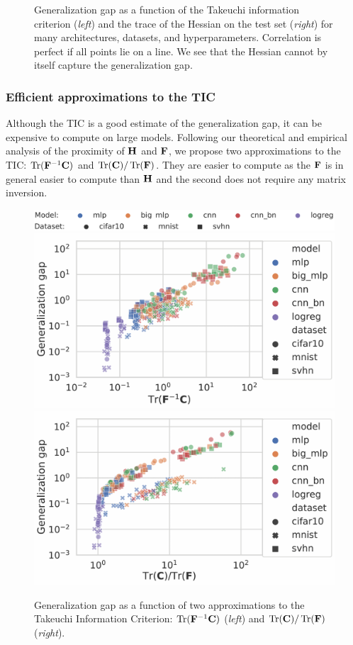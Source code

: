 \begin{figure}[ht]
      \caption{Generalization gap as a function of the Takeuchi information criterion (\emph{left}) and the trace of the Hessian on the test set (\emph{right}) for many architectures, datasets, and hyperparameters. Correlation is perfect if all points lie on a line. We see that the Hessian cannot by itself capture the generalization gap.}
      \label{fig:large_scale_tic}
\end{figure}




\subsubsection{Efficient approximations to the TIC}
\label{sec:tic_approx}
Although the TIC is a good estimate of the generalization gap, it can be expensive to compute on large models. Following our theoretical and empirical analysis of the proximity of ${\mathbf{H}}$ and ${\mathbf{F}}$, we propose two approximations to the TIC: $\operatorname{Tr}({\mathbf{F}}^{-1} {\mathbf{C}})$ and $\operatorname{Tr}({\mathbf{C}}) / \operatorname{Tr}({\mathbf{F}})$. They are easier to compute as the ${\mathbf{F}}$ is in general easier to compute than ${\mathbf{H}}$ and the second does not require any matrix inversion.


\begin{figure}[ht]
\centering
    \includegraphics[trim={00mm 0mm 0mm 0mm},clip,width=.8\textwidth]{articles/hfc/legend_gimp.png}
    \includegraphics[trim={0 0 60mm 0},clip,width=.46\textwidth]{articles/hfc/trfic750-2.pdf}
    \includegraphics[trim={0 0 60mm 0},clip,width=.46\textwidth]{articles/hfc/ratiotrcof750-2.pdf}
\caption{Generalization gap as a function of two approximations to the Takeuchi Information Criterion: $\operatorname{Tr}({\mathbf{F}}^{-1} {\mathbf{C}})$ (\emph{left}) and $\operatorname{Tr}({\mathbf{C}}) / \operatorname{Tr}({\mathbf{F}})$ (\emph{right}).
\label{fig:tic_approx}}
\end{figure}


